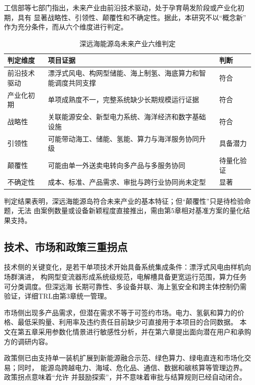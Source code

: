 工信部等七部门指出，未来产业由前沿技术驱动，处于孕育萌发阶段或产业化初期，具有
显著战略性、引领性、颠覆性和不确定性\cite{miit-future}。据此，本研究不以“概念新”
作为充分条件，而从六个维度进行判定。

\begin{table}[H]
\centering
\caption{深远海能源岛未来产业六维判定}
\label{tab:c2-six-dimensions}
\begin{tabularx}{\textwidth}{p{2.4cm} X p{2.6cm}}
\toprule
判定维度 & 项目证据 & 判断\\
\midrule
前沿技术驱动 & 漂浮式风电、构网型储能、海上制氢、海底算力和智能调度共同支撑 & 符合\\
产业化初期 & 单项成熟度不一，完整系统缺少长期规模运行证据 & 符合\\
战略性 & 关联能源安全、新型电力系统、海洋经济和数字基础设施 & 符合\\
引领性 & 可能带动海工、储能、氢能、算力与海洋服务协同升级 & 具备潜力\\
颠覆性 & 可能由单一外送卖电转向多产品与多服务协同 & 待量化验证\\
不确定性 & 成本、标准、产品需求、审批与跨行业协同尚未定型 & 显著\\
\bottomrule
\end{tabularx}
\end{table}

判定结果表明，深远海能源岛符合未来产业的基本特征；但“颠覆性”只是待检验命题，无法
由案例数量或设备新颖程度直接推出，需由第5章相对基准方案的量化结果支持。

\subsection{技术、市场和政策三重拐点}

技术侧的关键变化，是若干单项技术开始具备系统集成条件：漂浮式风电由样机向场群演进，
构网型变流器形成系统级规范，电解槽具备更宽运行范围，算力任务可分类调度。但深远海
长期可靠性、多设备并联、海上氢安全和跨主体控制仍需验证，详细TRL由第3章统一管理。

市场侧出现多产品需求，但潜在需求不等于可签约市场。电力、氢氨和算力的价格、最低采购量、利用率及违约责任目前缺少可直接用于本项目的合同数据。
本文在第五章采用参数化情景进行敏感性分析，并在第六章提出面向潜在用户和承购方的调研内容。

政策侧已由支持单一装机扩展到新能源融合示范、绿色算力、绿电直连和市场化交易；同时，
能源岛跨越电力、海域、危化品、通信、数据和碳核算等管理边界。政策拐点意味着“允许
并鼓励探索”，并不意味着审批与结算规则已经自动闭合。

